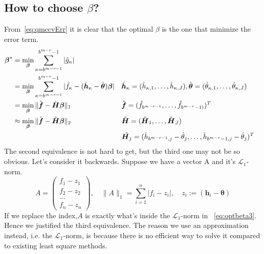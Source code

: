 \subsection{How to choose $\beta$?} 
From~\eqref{eq:qmccvErr} it is clear that the optimal $\beta$ is the one that minimize the error term. 
\begin{align}
    \label{eq:optbeta1}
    \boldsymbol{\beta}^*
    &=\min_{\boldsymbol{\beta}}\sum_{\kappa=b^{m-r-1}}^{b^{m-r}-1} |\hat{g}_{\kappa}|\\
    \label{eq:optbeta2}
    &=\min_{\boldsymbol{\beta}}\sum_{\kappa=b^{m-r-1}}^{b^{m-r}-1}|\hat{f}_\kappa
    -(\hat{\boldsymbol{h}}_\kappa - \hat{\boldsymbol{\theta}})\boldsymbol{\boldsymbol{\beta}}|
    && \hat{\boldsymbol{h}}_\kappa=(\hat{h}_{\kappa,1},\dots, \hat{h}_{\kappa,J}),
    \hat{\boldsymbol{\theta}}=(\hat{\theta}_{\kappa,1},\dots,\hat{\theta}_{\kappa,J})\\
    \label{eq:optbeta3}
    &=\min_{\boldsymbol{\beta}}\|\hat{\boldsymbol{f}}-\hat{\boldsymbol{H}}\boldsymbol{\beta}\|_1
    && \hat{\boldsymbol{f}}= (\hat{f}_{b^{m-r-1}},\dots,\hat{f}_{b^{m-r}-1)})^T \\
    \label{eq:optbeta4}
    &\approx\min_{\boldsymbol{\beta}}\|\hat{\boldsymbol{f}}-\hat{\boldsymbol{H}}\boldsymbol{\beta}\|_2
    && \hat{\boldsymbol{H}}= (\hat{\boldsymbol{H}}_1, \dots, \hat{\boldsymbol{H}}_J)\\
    & \notag 
    &&\hat{\boldsymbol{H}_j}=(\hat{h}_{b^{m-r-1},j}-\hat{\theta}_j,\dots, \hat{h}_{b^{m-r}-1,j}-\hat{\theta}_j)^T
\end{align}
The second equivalence is not hard to get, but the third one may not be so obvious. Let's consider it backwards. Suppose we have a vector A and it's $\mathcal{L}_1$-norm.
\[
   A=
    \begin{pmatrix}
        f_1-z_1\\
        f_2-z_2\\
        \hdots\\
        f_n-z_n
    \end{pmatrix},\quad
    \|A\|_1=\sum_{i=1}^{n}|f_i-z_i|, \quad
    z_i:=(\boldsymbol{h}_i-\boldsymbol{\theta})
\]
If we replace the index,$A$ is exactly what's inside the $\mathcal{L}_1$-norm in ~\eqref{eq:optbeta3}. 
Hence we justified the third equivalence. The reason we use an approximation instead, i.e. the $\mathcal{L}_1$-norm, is because there is no efficient way to solve it compared to existing least square methods.
